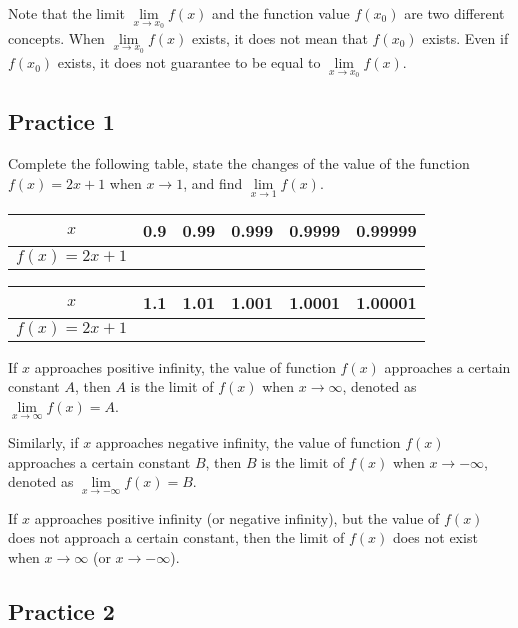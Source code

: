 \documentclass[12pt]{report}
\begin{document}
Note that the limit $\lim\limits_{x \to x_0} f (x)$ and the function value $f
    (x_0)$ are two different concepts. When $\lim\limits_{x \to x_0} f (x)$ exists,
it does not mean that $f (x_0)$ exists. Even if $f (x_0)$ exists, it does not
guarantee to be equal to $\lim\limits_{x \to x_0} f (x)$.

\subsection{Practice 1}

Complete the following table, state the changes of the value of the function $f
    (x) = 2x + 1$ when $x \to 1$, and find $\lim\limits_{x \to 1} f (x)$.

\begin{center}
    \begin{tabular}{|c|c|c|c|c|c|}
        \hline
        $x$              & 0.9 & 0.99 & 0.999 & 0.9999 & 0.99999 \\
        \hline
        $f (x) = 2x + 1$ &     &      &       &        &         \\
        \hline
    \end{tabular}
\end{center}
\begin{center}
    \begin{tabular}{|c|c|c|c|c|c|}
        \hline
        $x$              & 1.1 & 1.01 & 1.001 & 1.0001 & 1.00001 \\
        \hline
        $f (x) = 2x + 1$ &     &      &       &        &         \\
        \hline
    \end{tabular}
\end{center}

If $x$ approaches positive infinity, the value of function $f (x)$ approaches a
certain constant $A$, then $A$ is the limit of $f (x)$ when $x \to \infty$,
denoted as $\lim\limits_{x \to \infty} f (x) = A$.

Similarly, if $x$ approaches negative infinity, the value of function $f (x)$
approaches a certain constant $B$, then $B$ is the limit of $f (x)$ when $x \to
    -\infty$, denoted as $\lim\limits_{x \to -\infty} f (x) = B$.

If $x$ approaches positive infinity (or negative infinity), but the value of $f
    (x)$ does not approach a certain constant, then the limit of $f (x)$ does not
exist when $x \to \infty$ (or $x \to -\infty$).

\subsection{Practice 2}
\end{document}
